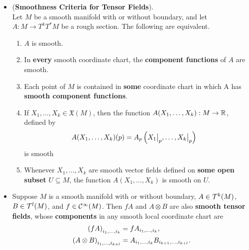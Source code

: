 \documentclass[11pt]{article}
\begin{document}
\begin{itemize}
\item \begin{proposition} (\textbf{Smoothness Criteria for Tensor Fields}).\\
Let $M$ be a smooth manifold with or without boundary, and let $A: M \rightarrow T^kT^{*}M$ be a rough section. The following are equivalent.
\begin{enumerate}
\item $A$ is smooth.
\item In \textbf{every} smooth coordinate chart, the \textbf{component functions} of $A$ are smooth.
\item Each point of $M$ is contained in \textbf{some} coordinate chart in which A has \textbf{smooth component functions}.
\item If $X_1,\ldots,X_k \in \mathfrak{X}(M)$, then the function $A(X_1,\ldots,X_k): M \rightarrow {\mathbb R}$, defined by
\begin{align}
A(X_1,\ldots,X_k)(p) &= A_{p}\left(X_1\bigr|_{p},\ldots,X_k\bigr|_{p}\right) \label{eqn: covariant_tensor_field_induce_smooth_function}
\end{align} is smooth
\item Whenever $X_1,\ldots,X_k$ are smooth vector fields defined on \textbf{some open subset} $U\subseteq M$, the function $A(X_1,\ldots,X_k)$ is smooth on $U$.
\end{enumerate}
\end{proposition}

\item \begin{proposition}
Suppose $M$ is a smooth manifold with or without boundary, $A \in {\mathcal T}^k(M)$, $B \in {\mathcal T}^{l}(M)$, and $f \in {\mathcal C}^{\infty}(M)$. Then $fA$ and $A \otimes B$ are also \textbf{smooth tensor fields}, whose \textbf{components} in any smooth local coordinate chart are
\begin{align*}
\left(fA\right)_{i_1,\ldots, i_k} &= fA_{i_1,\ldots,i_k}, \\
\left(A \otimes B\right)_{i_1,\ldots, i_{k+l}} &= A_{i_1,\ldots,i_k}B_{i_{k+1},\ldots,i_{k+l}}.
\end{align*}
\end{proposition}


\end{itemize}
\end{document}
